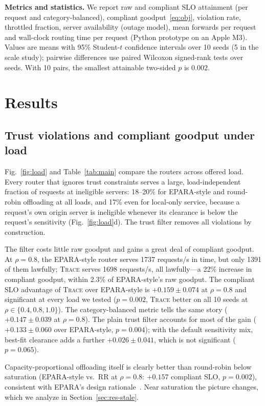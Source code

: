 \documentclass[journal]{IEEEtran}
\newcommand{\sys}{\textsc{Trace}}
\begin{document}
\textbf{Metrics and statistics.} We report raw and compliant SLO attainment (per request and category-balanced), compliant goodput~\eqref{eq:obj}, violation rate, throttled fraction, server availability (outage model), mean forwards per request and wall-clock routing time per request (Python prototype on an Apple M3). Values are means with 95\% Student-$t$ confidence intervals over 10 seeds (5 in the scale study); pairwise differences use paired Wilcoxon signed-rank tests over seeds. With 10 pairs, the smallest attainable two-sided $p$ is $0.002$.

\section{Results}\label{sec:results}

\subsection{Trust violations and compliant goodput under load}\label{sec:res-load}

Fig.~\ref{fig:load} and Table~\ref{tab:main} compare the routers across offered load. Every router that ignores trust constraints serves a large, load-independent fraction of requests at ineligible servers: 18--20\% for EPARA-style and round-robin offloading at all loads, and 17\% even for local-only service, because a request's own origin server is ineligible whenever its clearance is below the request's sensitivity (Fig.~\ref{fig:load}d). The trust filter removes all violations by construction.

The filter costs little raw goodput and gains a great deal of compliant goodput. At $\rho=0.8$, the EPARA-style router serves 1737 requests/s in time, but only 1391 of them lawfully; \sys{} serves 1698 requests/s, all lawfully---a 22\% increase in compliant goodput, within 2.3\% of EPARA-style's raw goodput. The compliant SLO advantage of \sys{} over EPARA-style is $+0.159\pm0.074$ at $\rho=0.8$ and significant at every load we tested ($p=0.002$, \sys{} better on all 10 seeds at $\rho\in\{0.4,0.8,1.0\}$). The category-balanced metric tells the same story ($+0.147\pm0.039$ at $\rho=0.8$). The plain trust filter accounts for most of the gain ($+0.133\pm0.060$ over EPARA-style, $p=0.004$); with the default sensitivity mix, best-fit clearance adds a further $+0.026\pm0.041$, which is not significant ($p=0.065$).

Capacity-proportional offloading itself is clearly better than round-robin below saturation (EPARA-style vs.\ RR at $\rho=0.8$: $+0.157$ compliant SLO, $p=0.002$), consistent with EPARA's design rationale~\cite{epara2025}. Near saturation the picture changes, which we analyze in Section~\ref{sec:res-stale}.
\end{document}
